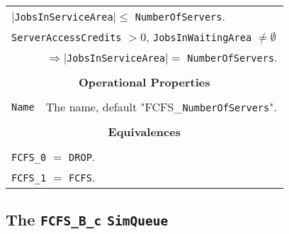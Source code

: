 \documentclass[12pt]{book}
\begin{document}
\begin{tabular}{|l|l|l|l|}
\multicolumn{4}{|l|}{$|$\lstinline|JobsInServiceArea|$| \leq$ \lstinline|NumberOfServers|.} \\
\multicolumn{4}{|l|}{\lstinline|ServerAccessCredits| $> 0$, \lstinline|JobsInWaitingArea| $\neq \emptyset$} \\
    \multicolumn{1}{|l}{}
  & \multicolumn{3}{l|}{$\Rightarrow |$\lstinline|JobsInServiceArea|$| =$ \lstinline|NumberOfServers|.} \\
\hline
\multicolumn{4}{|c|}{} \\
\multicolumn{4}{|c|}{\bf Operational Properties} \\
\multicolumn{4}{|c|}{} \\
\hline
\lstinline|Name| & \multicolumn{3}{|l|}{The name, default "FCFS\_\lstinline{NumberOfServers}".} \\
\hline
\multicolumn{4}{|c|}{} \\
\multicolumn{4}{|c|}{\bf Equivalences} \\
\multicolumn{4}{|c|}{} \\
\hline
\multicolumn{4}{|l|}{\lstinline|FCFS_0| $=$ \lstinline|DROP|.} \\
\multicolumn{4}{|l|}{\lstinline|FCFS_1| $=$ \lstinline|FCFS|.} \\
\hline
\end{tabular}

\subsection{The \lstinline{FCFS_B_c} \lstinline{SimQueue}}
\end{document}
